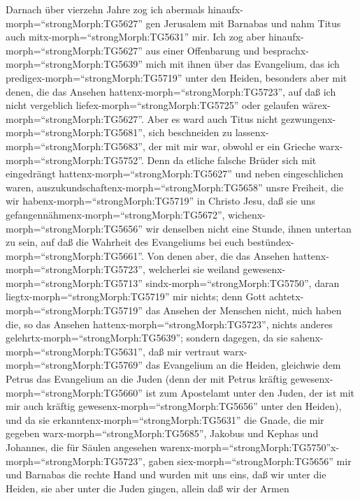  Darnach über vierzehn Jahre zog ich abermals
hinaufx-morph=``strongMorph:TG5627'' gen Jerusalem mit Barnabas und nahm
Titus auch mitx-morph=``strongMorph:TG5631'' mir.  Ich zog
aber hinaufx-morph=``strongMorph:TG5627'' aus einer Offenbarung und
besprachx-morph=``strongMorph:TG5639'' mich mit ihnen über das
Evangelium, das ich predigex-morph=``strongMorph:TG5719'' unter den
Heiden, besonders aber mit denen, die das Ansehen
hattenx-morph=``strongMorph:TG5723'', auf daß ich nicht vergeblich
liefex-morph=``strongMorph:TG5725'' oder gelaufen
wärex-morph=``strongMorph:TG5627''.  Aber es ward auch Titus
nicht gezwungenx-morph=``strongMorph:TG5681'', sich beschneiden zu
lassenx-morph=``strongMorph:TG5683'', der mit mir war, obwohl er ein
Grieche warx-morph=``strongMorph:TG5752''.  Denn da etliche
falsche Brüder sich mit eingedrängt hattenx-morph=``strongMorph:TG5627''
und neben eingeschlichen waren,
auszukundschaftenx-morph=``strongMorph:TG5658'' unsre Freiheit, die wir
habenx-morph=``strongMorph:TG5719'' in Christo Jesu, daß sie uns
gefangennähmenx-morph=``strongMorph:TG5672'', 
wichenx-morph=``strongMorph:TG5656'' wir denselben nicht eine Stunde,
ihnen untertan zu sein, auf daß die Wahrheit des Evangeliums bei euch
bestündex-morph=``strongMorph:TG5661''.  Von denen aber, die
das Ansehen hattenx-morph=``strongMorph:TG5723'', welcherlei sie weiland
gewesenx-morph=``strongMorph:TG5713''
sindx-morph=``strongMorph:TG5750'', daran
liegtx-morph=``strongMorph:TG5719'' mir nichts; denn Gott
achtetx-morph=``strongMorph:TG5719'' das Ansehen der Menschen nicht,
mich haben die, so das Ansehen hattenx-morph=``strongMorph:TG5723'',
nichts anderes gelehrtx-morph=``strongMorph:TG5639''; 
sondern dagegen, da sie sahenx-morph=``strongMorph:TG5631'', daß mir
vertraut warx-morph=``strongMorph:TG5769'' das Evangelium an die Heiden,
gleichwie dem Petrus das Evangelium an die Juden  (denn der
mit Petrus kräftig gewesenx-morph=``strongMorph:TG5660'' ist zum
Apostelamt unter den Juden, der ist mit mir auch kräftig
gewesenx-morph=``strongMorph:TG5656'' unter den Heiden), 
und da sie erkanntenx-morph=``strongMorph:TG5631'' die Gnade, die mir
gegeben warx-morph=``strongMorph:TG5685'', Jakobus und Kephas und
Johannes, die für Säulen angesehen
warenx-morph=``strongMorph:TG5750''x-morph=``strongMorph:TG5723'', gaben
siex-morph=``strongMorph:TG5656'' mir und Barnabas die rechte Hand und
wurden mit uns eins, daß wir unter die Heiden, sie aber unter die Juden
gingen,  allein daß wir der Armen
